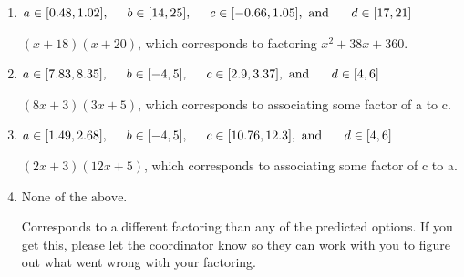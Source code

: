 \documentclass{extbook}[14pt]
\begin{document}
\begin{enumerate}
{\begin{enumerate}[label=\Alph*.]
* $(4x + 3)(6x + 5)$, which is the correct option.
\item \( a \in [0.48, 1.02], \hspace*{5mm} b \in [14, 25], \hspace*{5mm} c \in [-0.66, 1.05], \text{ and } \hspace*{5mm} d \in [17, 21] \)

 $(x + 18)(x + 20)$, which corresponds to factoring $x^{2} +38 x + 360$.
\item \( a \in [7.83, 8.35], \hspace*{5mm} b \in [-4, 5], \hspace*{5mm} c \in [2.9, 3.37], \text{ and } \hspace*{5mm} d \in [4, 6] \)

 $(8x + 3)(3x + 5)$, which corresponds to associating some factor of a to c.
\item \( a \in [1.49, 2.68], \hspace*{5mm} b \in [-4, 5], \hspace*{5mm} c \in [10.76, 12.3], \text{ and } \hspace*{5mm} d \in [4, 6] \)

 $(2x + 3)(12x + 5)$, which corresponds to associating some factor of c to a.
\item \( \text{None of the above.} \)

 Corresponds to a different factoring than any of the predicted options. If you get this, please let the coordinator know so they can work with you to figure out what went wrong with your factoring.
\end{enumerate}

}
\end{enumerate}
\end{document}
